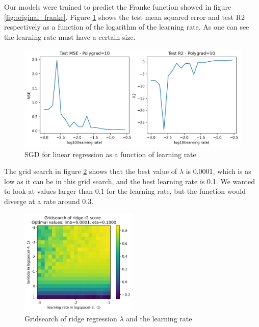 \documentclass[12pt,a4paper]{article}
\begin{document}
    Our models were trained to predict the Franke function showed in figure \ref{fig:original_franke}. Figure \ref{fig:SGD_eta_graph} shows the test mean squared error and test R2 respectively as a function of the logarithm of the learning rate. As one can see the learning rate must have a certain size.

    \begin{figure}[H]
        \centering
        \includegraphics[width=\textwidth]{figures/sgd_linreg_constant_eval.png}
        \caption{SGD for linear regression as a function of learning rate}
        \label{fig:SGD_eta_graph}
    \end{figure}

    The grid search in figure \ref{fig:grid} shows that the best value of $\lambda$ is 0.0001, which is as low as it can be in this grid search, and the best learning rate is 0.1. We wanted to look at values larger than 0.1 for the learning rate, but the function would diverge at a rate around 0.3.

    \begin{figure}[H]
        \centering
        \includegraphics[width=0.5\textwidth]{figures/gridsearch_eta_lmb_ridge.png}
        \caption{Gridsearch of ridge regression  $\lambda$ and the learning rate}
        \label{fig:grid}
    \end{figure}
\end{document}
